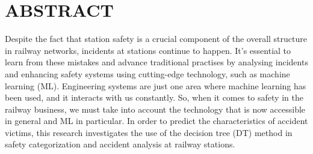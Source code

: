 \chapter*{\centering ABSTRACT}
\thispagestyle{empty}
Despite the fact that station safety is a crucial component of the overall structure in railway networks, incidents at stations continue to happen. It's essential to learn from these mistakes and advance traditional practises by analysing incidents and enhancing safety systems using cutting-edge technology, such as machine learning (ML).
Engineering systems are just one area where machine learning has been used, and it interacts with us constantly.
So, when it comes to safety in the railway business, we must take into account the technology that is now accessible in general and ML in particular.
In order to predict the characteristics of accident victims, this research investigates the use of the decision tree (DT) method in safety categorization and accident analysis at railway stations. 